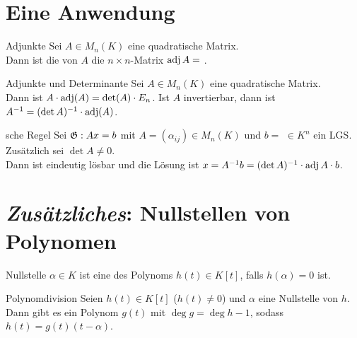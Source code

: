 \section{%
    Eine Anwendung%
}

\begin{Def}{Adjunkte}
    Sei $A \in M_n(K)$ eine quadratische Matrix. \\
    Dann ist die  von $A$ die $n \times n$-Matrix
    $\operatorname{adj} A =$ .
\end{Def}

\begin{Satz}{Adjunkte und Determinante}
    Sei $A \in M_n(K)$ eine quadratische Matrix. \\
    Dann ist $A \cdot \operatorname{adj}(A) = \det(A) \cdot E_n$. \qquad
    Ist $A$ invertierbar, dann ist $A^{-1} = (\det A)^{-1} \cdot \operatorname{adj}(A)$.
\end{Satz}

\begin{Satz}{sche Regel}
    Sei $\mathfrak{G}: Ax = b$ mit $A = (\alpha_{ij}) \in M_n(K)$ und
    $b = $  $ \in K^n$ ein LGS.
    Zusätzlich sei $\det A \not= 0$. \\
    Dann ist  eindeutig lösbar und die Lösung ist
    $x = A^{-1} b = (\det A)^{-1} \cdot \operatorname{adj} A \cdot b$.
\end{Satz}

\section{%
    \emph{Zusätzliches}: Nullstellen von Polynomen%
}

\begin{Def}{Nullstelle}
    $\alpha \in K$ ist eine  des Polynoms $h(t) \in K[t]$,
    falls $h(\alpha) = 0$ ist.
\end{Def}

\begin{Satz}{Polynomdivision}
    Seien $h(t) \in K[t]$ ($h(t) \not= 0$) und $\alpha$ eine Nullstelle
    von $h$. \\
    Dann gibt es ein Polynom $g(t)$ mit $\deg g = \deg h - 1$, sodass
    $h(t) = g(t) (t - \alpha)$.
\end{Satz}

